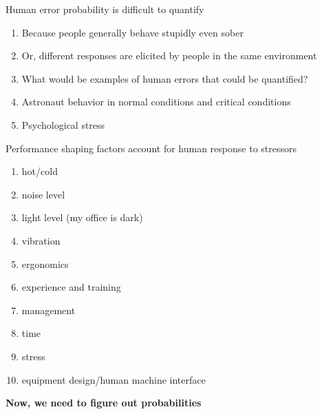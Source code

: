 \documentclass[aspectratio=1610,pdftex,dvipsnames,compress,xcolor={dvipsnames}]{beamer}
\begin{document}
\addtocounter{framenumber}{-1}
\begin{frame}{Human error probability is difficult to quantify}
    \begin{enumerate}[series=outerlist,topsep=0pt,itemsep=21pt,leftmargin=*,label=(\arabic*)]
        \item[]Because people generally behave stupidly even sober
        \item[]Or, different responses are elicited by people in the same environment
        \item[]What would be examples of human errors that could be quantified?
        \item[]Astronaut behavior in normal conditions and critical conditions
        \item[]Psychological stress
    \end{enumerate}
\end{frame}


\begin{frame}{Performance shaping factors account for human response to stressors}
    \begin{enumerate}[series=outerlist,topsep=0pt,itemsep=3pt,leftmargin=*,label=(\arabic*)]
        \item[]hot/cold  
        \item[]noise level   
        \item[]light level (my office is dark)  
        \item[]vibration  
        \item[]ergonomics
        \item[]experience and training
        \item[]management
        \item[]time
        \item[]stress
        \item[]equipment design/human machine interface
    \end{enumerate}
\end{frame}


\begin{frame}[plain]{}
    \centering\LARGE\textbf{Now, we need to figure out probabilities}
\end{frame}
\end{document}
